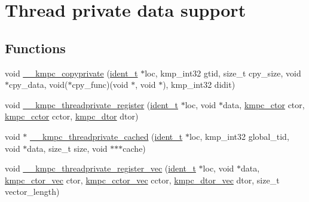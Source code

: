 \hypertarget{group__THREADPRIVATE}{\section{Thread private data support}
\label{group__THREADPRIVATE}
}
\subsection*{Functions}
\begin{DoxyCompactItemize}
\item 
void \hyperlink{group__THREADPRIVATE_ga1453eca6136fd77e5de88ea0e78cc7a4}{\-\_\-\-\_\-kmpc\-\_\-copyprivate} (\hyperlink{group__BASIC__TYPES_ga690fda6b92f039a72db263c6b4394ddb}{ident\-\_\-t} $\ast$loc, kmp\-\_\-int32 gtid, size\-\_\-t cpy\-\_\-size, void $\ast$cpy\-\_\-data, void($\ast$cpy\-\_\-func)(void $\ast$, void $\ast$), kmp\-\_\-int32 didit)
\item 
void \hyperlink{group__THREADPRIVATE_ga120efa08eb51f45664477d30eff31916}{\-\_\-\-\_\-kmpc\-\_\-threadprivate\-\_\-register} (\hyperlink{group__BASIC__TYPES_ga690fda6b92f039a72db263c6b4394ddb}{ident\-\_\-t} $\ast$loc, void $\ast$data, \hyperlink{group__THREADPRIVATE_ga0c2f8074a8474eee42bc96a4bdc7679a}{kmpc\-\_\-ctor} ctor, \hyperlink{group__THREADPRIVATE_gab6148c019e88c8853596bf5f516373b4}{kmpc\-\_\-cctor} cctor, \hyperlink{group__THREADPRIVATE_gad8268ac7d007fa1c3351da682c487c0f}{kmpc\-\_\-dtor} dtor)
\item 
void $\ast$ \hyperlink{group__THREADPRIVATE_gab4aa3dff2b1b55b1abb002ef69c7efe7}{\-\_\-\-\_\-kmpc\-\_\-threadprivate\-\_\-cached} (\hyperlink{group__BASIC__TYPES_ga690fda6b92f039a72db263c6b4394ddb}{ident\-\_\-t} $\ast$loc, kmp\-\_\-int32 global\-\_\-tid, void $\ast$data, size\-\_\-t size, void $\ast$$\ast$$\ast$cache)
\item 
void \hyperlink{group__THREADPRIVATE_gaec6e88892a1b0b62287df5173a7f0336}{\-\_\-\-\_\-kmpc\-\_\-threadprivate\-\_\-register\-\_\-vec} (\hyperlink{group__BASIC__TYPES_ga690fda6b92f039a72db263c6b4394ddb}{ident\-\_\-t} $\ast$loc, void $\ast$data, \hyperlink{group__THREADPRIVATE_gac1f868aef7d531d34b91eaa57e339f21}{kmpc\-\_\-ctor\-\_\-vec} ctor, \hyperlink{group__THREADPRIVATE_gaf9503cacabf6cf90ed34f2727fc480bc}{kmpc\-\_\-cctor\-\_\-vec} cctor, \hyperlink{group__THREADPRIVATE_gab7035b42d465074b31195534efb37e3b}{kmpc\-\_\-dtor\-\_\-vec} dtor, size\-\_\-t vector\-\_\-length)
\end{DoxyCompactItemize}
